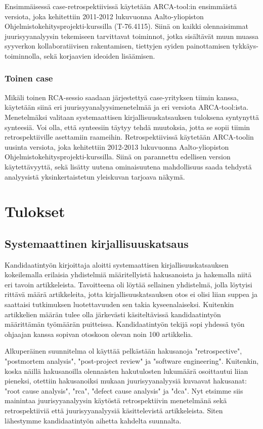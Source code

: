 Ensimmäisessä case-retrospektiivissä käytetään ARCA-tool:in ensimmäistä versiota, joka kehitettiin 2011-2012 lukuvuonna Aalto-yliopiston Ohjelmistokehitysprojekti-kurssilla (T-76.4115). Siinä on kaikki olennaisimmat juurisyyanalyysin tekemiseen tarvittavat toiminnot, jotka sisältävät muun muassa syyverkon kollaboratiivisen rakentamisen, tiettyjen syiden painottamisen tykkäys-toiminnolla, sekä korjaavien ideoiden lisäämisen.

\subsubsection{Toinen case}
Mikäli toinen RCA-sessio saadaan järjestettyä case-yrityksen tiimin kanssa, käytetään siinä eri juurisyyanalyysimenetelmää ja eri versiota ARCA-tool:ista. Menetelmäksi valitaan systemaattisen kirjallisuuskatsauksen tuloksena syntynyttä synteesiä. Voi olla, että synteesiin täytyy tehdä muutoksia, jotta se sopii tiimin retrospektiiville asettamiin raameihin. Retrospektiivissä käytetään ARCA-toolin uusinta versiota, joka kehitettiin 2012-2013 lukuvuonna Aalto-yliopiston Ohjelmistokehitysprojekti-kurssilla. Siinä on parannettu edellisen version käytettävyyttä, sekä lisätty uutena ominaisuutena mahdollisuus saada tehdystä analyysistä yksinkertaistetun yleiskuvan tarjoava näkymä.

\section{Tulokset}
\subsection{Systemaattinen kirjallisuuskatsaus}
Kandidaatintyön kirjoittaja aloitti systemaattisen kirjallisuuskatsauksen kokeilemalla erilaisia yhdistelmiä määritellyistä hakusanoista ja hakemalla niitä eri tavoin artikkeleista. Tavoitteena oli löytää sellainen yhdistelmä, jolla löytyisi rittävä määrä artikkeleita, jotta kirjallisuuskatsauksen otos ei olisi liian suppea ja saattaisi tutkimuksen luotettavuuden sen takia kyseenalaiseksi. Kuitenkin artikkelien määrän tulee olla järkevästi käsiteltävissä kandidaatintyön määrittämän työmäärän puitteissa. Kandidaatintyön tekijä sopi yhdessä työn ohjaajan kanssa sopivan otoskoon olevan noin 100 artikkelia.

Alkuperäinen suunnitelma ol käyttää pelkästään hakusanoja "retrospective",  "postmortem analysis", "post-project review" ja "software engineering". Kuitenkin, koska näillä hakusanoilla olennaisten hakutulosten lukumäärä osoittautui liian pieneksi, otettiin hakusanoiksi mukaan juurisyyanalyysiä kuvaavat hakusanat: "root cause analysis", "rca", "defect cause analysis" ja "dca". Nyt etsimme siis mainintaa juurisyyanalyysin käytöstä retrospektiivin menetelmänä sekä retrospektiiviä että juurisyyanalyysiä käsittelevistä artikkeleista. Siten lähestymme kandidaatintyön aihetta kahdelta suunnalta.

